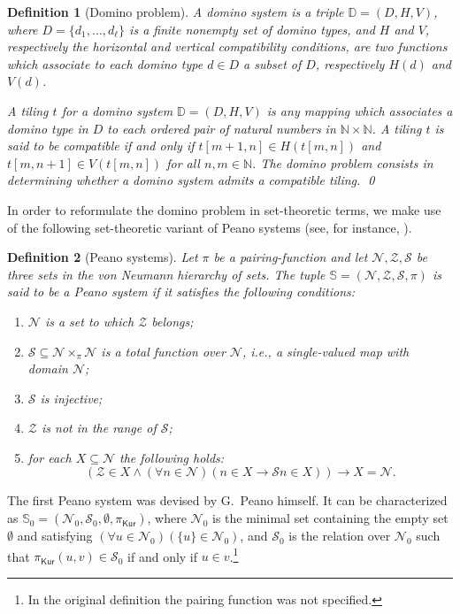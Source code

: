\documentclass[submission,copyright,creativecommons]{eptcs}
\newtheorem{definition}{Definition}
\newcommand{\nat}{\mathbb{N}}
\newcommand{\dominoSys}{\mathbb{D}}
\newcommand{\peanSys}{\mathbb{S}}
\newcommand{\peanN}{\mathcal{N}}
\newcommand{\peanZ}{\mathcal{Z}}
\newcommand{\peanS}{\mathcal{S}}
\newcommand{\sx}{u}
\newcommand{\sy}{v}
\newcommand{\corr}[1]{#1}
\begin{document}
\begin{definition}[Domino problem]\label{DOMINO}
A \emph{domino system} is a triple $\dominoSys=(D,H,V)$, where
$D=\{d_1, \ldots, d_\ell\}$ is a finite nonempty set of \emph{domino
types}, and $H$ and $V$, respectively the \emph{horizontal} and
\emph{vertical compatibility conditions}, are two functions
which associate to each domino type $d \in D$ a subset of $D$,
respectively $H(d)$ and $V(d)$.

A \emph{tiling} $t$ for a domino system $\dominoSys=(D,H,V)$
is any mapping which associates a domino type in $D$ to each 
ordered pair of natural numbers in $\nat \times \nat$.
A tiling $t$ is said to be \emph{compatible} 
if and only if  $t [m+1,n] \in H(t[m,n])$ and 
$t [m, n+1] \in V(t[m,n])$ for all $n,m \in \nat$.
The \emph{domino problem} consists in 
determining whether a domino system admits a compatible tiling.
\qed
\end{definition}

In order to reformulate the domino problem in set-theoretic terms, we
make use of the following set-theoretic variant of Peano systems (see, 
for instance, \cite{Mos2005}).


\begin{definition}[Peano systems]\label{PEANO}
Let $\pi$ be a pairing-function and let $\peanN, \peanZ, \peanS$ be
three sets in the von Neumann hierarchy of sets.  The tuple
$\peanSys=(\peanN, \peanZ, \peanS, \pi)$ is said to be a Peano system
if it satisfies the following conditions:

\begin{enumerate}[label=\textbf{(P\arabic*)}]
 \item\label{P1} $\peanN$ is a set to which $\peanZ$ belongs;

 \item\label{P2} $\peanS \subseteq \peanN \times_{\pi} \peanN$ is a
 total function over $\peanN$, i.e., a single-valued map with domain
 $\peanN$;


 \item\label{P3} $\peanS$ is injective;
 
 \item\label{P4} $\peanZ$ is not in the range of $\peanS$;
 
 \item\label{P5} for each $X \subseteq \peanN$ the following holds:
\[
 (\peanZ \in X \wedge (\forall n \in \peanN)(n \in X \longrightarrow \peanS n \in X)) \longrightarrow X = \peanN.
\]
\end{enumerate}
\end{definition}
\noindent The first Peano system was devised by G.\ Peano himself.  It
can be \corr{characterized} as $\peanSys_{0}=(\peanN_{0}, \peanS_{0},
\emptyset, \pi_{\mathsf{Kur}})$, where $\peanN_{0}$ is the minimal set
containing the empty set $\emptyset$ and satisfying $(\forall \sx \in
\peanN_{0})(\{\sx\} \in \peanN_{0})$, and $\peanS_{0}$ is the relation
over $\peanN_{0}$ such that $\pi_{\mathsf{Kur}}(\sx, \sy) \in
\peanS_{0}$ if and only if $\sx \in \sy$.\footnote{In the original
definition the pairing function was not specified.}
\end{document}
